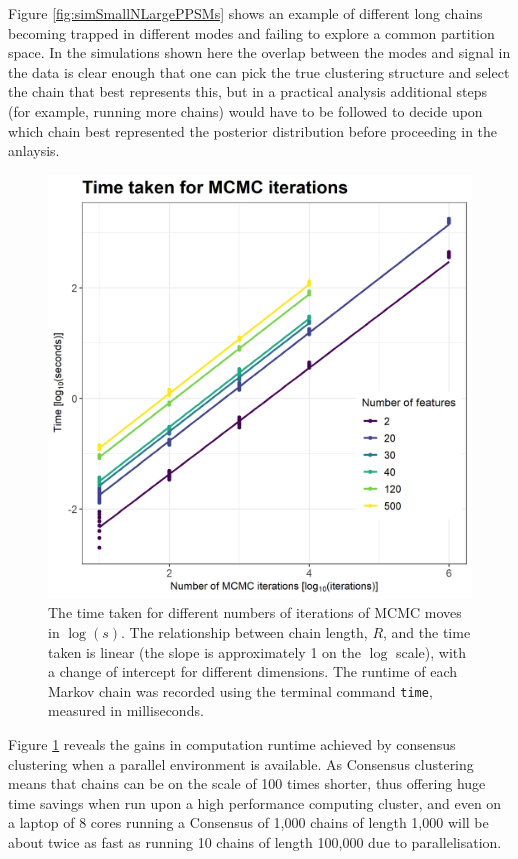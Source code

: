 \documentclass{bioinfo}
\begin{document}
Figure \ref{fig:simSmallNLargePPSMs} shows an example of different long chains becoming trapped in different modes and failing to explore a common partition space. In the simulations shown here the overlap between the modes and signal in the data is clear enough that one can pick the true clustering structure and select the chain that best represents this, but in a practical analysis additional steps (for example, running more chains) would have to be followed to decide upon which chain best represented the posterior distribution before proceeding in the anlaysis.

\begin{figure} %
	\centering
	\includegraphics[scale=0.45]{./Images/Simulations/TimeComparison.png}	
	\caption{The time taken for different numbers of iterations of MCMC moves in $\log(s)$. The relationship between chain length, $R$, and the time taken is linear (the slope is approximately 1 on the $\log$ scale), with a change of intercept for different dimensions. The runtime of each Markov chain was recorded using the terminal command \texttt{time}, measured in milliseconds.}
	\label{fig:timeMCMC}
\end{figure}

Figure \ref{fig:timeMCMC} reveals the gains in computation runtime achieved by consensus clustering when a parallel environment is available. As Consensus clustering means that chains can be on the scale of 100 times shorter, thus offering huge time savings when run upon a high performance computing cluster, and even on a laptop of 8 cores running a Consensus of 1,000 chains of length 1,000 will be about twice as fast as running 10 chains of length 100,000 due to parallelisation.
\end{document}
